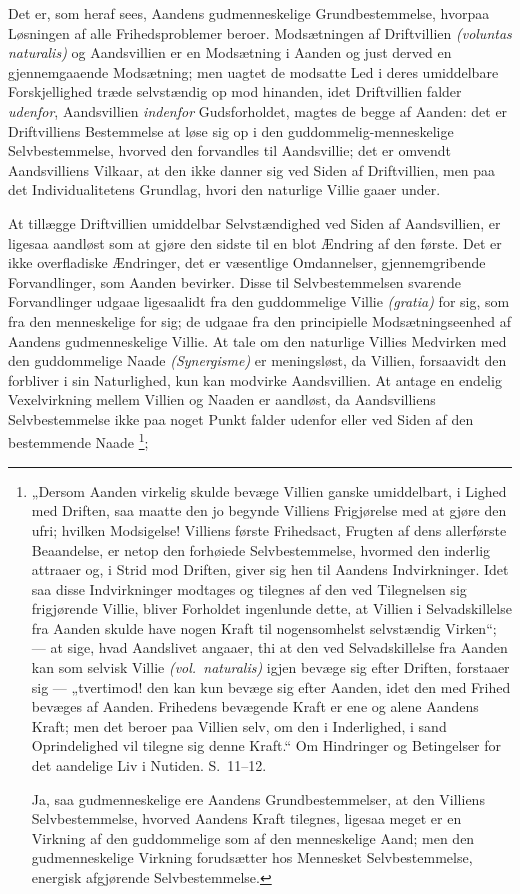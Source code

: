 \documentclass[12pt]{book}
\begin{document}
Det er, som heraf sees, Aandens gudmenneskelige Grundbestemmelse,
hvorpaa Løsningen af alle Frihedsproblemer beroer. Modsætningen af
Driftvillien \textit{(voluntas naturalis)} og Aandsvillien er en
Modsætning i Aanden og just derved en gjennemgaaende Modsætning; men
uagtet de modsatte Led i deres umiddelbare Forskjellighed træde
selvstændig op mod hinanden, idet Driftvillien falder
\emph{udenfor}, Aandsvillien \emph{indenfor} Gudsforholdet, magtes de
begge af Aanden: det er Driftvilliens Bestemmelse at løse sig op i
den guddommelig-menneskelige Selvbestemmelse, hvorved den forvandles
til Aandsvillie; det er omvendt Aandsvilliens Vilkaar, at den ikke
danner sig ved Siden af Driftvillien, men paa det Individualitetens
Grundlag, hvori den naturlige Villie gaaer under.

At tillægge Driftvillien umiddelbar Selvstændighed ved Siden af
Aandsvillien, er ligesaa aandløst som at gjøre den sidste til en
blot Ændring af den første. Det er ikke overfladiske Ændringer, det
er væsentlige Omdannelser, gjennemgribende Forvandlinger, som Aanden
bevirker. Disse til Selvbestemmelsen svarende Forvandlinger udgaae
ligesaalidt fra den guddommelige Villie \textit{(gratia)} for sig,
som fra den menneskelige for sig; de udgaae fra den principielle
Modsætningseenhed af Aandens gudmenneskelige Villie. At tale om den
naturlige Villies Medvirken med den guddommelige Naade
\textit{(Synergisme)} er meningsløst, da Villien, forsaavidt den
forbliver i sin Naturlighed, kun kan modvirke Aandsvillien. At
antage en endelig Vexelvirkning mellem Villien og Naaden er
aandløst, da Aandsvilliens Selvbestemmelse ikke paa noget Punkt
falder udenfor eller ved Siden af den bestemmende Naade%
\footnote{„Dersom Aanden virkelig skulde bevæge Villien ganske
umiddelbart, i Lighed med Driften, saa maatte den jo begynde
Villiens Frigjørelse med at gjøre den ufri; hvilken Modsigelse!
Villiens første Frihedsact, Frugten af dens allerførste Beaandelse,
er netop den forhøiede Selvbestemmelse, hvormed den inderlig
attraaer og, i Strid mod Driften, giver sig hen til Aandens
Indvirkninger. Idet saa disse Indvirkninger modtages og tilegnes af
den ved Tilegnelsen sig frigjørende Villie, bliver Forholdet
ingenlunde dette, at Villien i Selvadskillelse fra Aanden skulde
have nogen Kraft til nogensomhelst selvstændig Virken“; --- at sige,
hvad Aandslivet angaaer, thi at den ved Selvadskillelse fra Aanden
kan som selvisk Villie \textit{(vol.\ naturalis)} igjen bevæge sig
efter Driften, forstaaer sig --- „tvertimod! den kan kun bevæge sig
efter Aanden, idet den med Frihed bevæges af Aanden. Frihedens
bevægende Kraft er ene og alene Aandens Kraft; men det beroer paa
Villien selv, om den i Inderlighed, i sand Oprindelighed vil tilegne
sig denne Kraft.“ Om Hindringer og Betingelser for det aandelige Liv
i Nutiden. S.\ 11--12.

Ja, saa gudmenneskelige ere Aandens Grundbestemmelser, at den
Villiens Selvbestemmelse, hvorved Aandens Kraft tilegnes, ligesaa
meget er en Virkning af den guddommelige som af den menneskelige
Aand; men den gudmenneskelige Virkning forudsætter hos Mennesket
Selvbestemmelse, energisk afgjørende Selvbestemmelse.};
\end{document}
